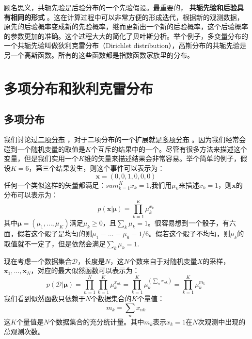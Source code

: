 \documentclass[10pt,a4paper,UTF8]{article}
\begin{document}
顾名思义，共轭先验是后验分布的一个先验假设。最重要的， \textbf{共轭先验和后验具有相同的形式} 。这在计算过程中可以非常方便的形成迭代，根据新的观测数据，原先的后验概率变成新的先验概率，继而更新出一个新的后验概率，这个后验概率的参数更加的准确。这个过程大大的简化了贝叶斯分析。举个例子，多变量分布的一个共轭先验叫做狄利克雷分布（Dirichlet distribution），高斯分布的共轭先验是另一个高斯函数。所有的这些函数都是指数函数家族里的分布。
\section{多项分布和狄利克雷分布}
\label{sec:org7eb1fab}


\subsection{多项分布}
\label{sec:orgb360b48}

我们讨论过\href{file:///c:/Users/cliyh/AppData/Roaming/zorg/output/math/probability/binary-distribution.thm}{二项分布} ，对于二项分布的一个扩展就是\href{file:///c:/Users/cliyh/AppData/Roaming/zorg/output/math/probability/afcp-01dot5-multinomial-coefficients.org}{多项分布} 。因为我们经常会碰到一个随机变量的取值是\(K\)个互斥的结果中的一个。尽管有很多方法来描述这个变量，但是我们实用一个\(K\)维的矢量来描述结果会非常容易。举个简单的例子，假设\(K=6\)，第三个结果发生，则这个事件可以表示为：
\begin{equation}
\label{eq:1}
\mathbf{x} = (0,0,1,0,0,0)
\end{equation}
任何一个类似这样的矢量都满足：\(sum_{k=1}^{K}x_{k} = 1\),我们用\(\mu_{k}\)来描述\(x_{k}=1\)，则\(\mathbf{x}\)的分布可以表示为：
\begin{equation}
\label{eq:2}
p(\mathbf{x}| \mathrm{\mu}) = \prod_{k=1}^{K}\mu_{k}^{x_{k}}
\end{equation}
其中\(\mathbf{\mu} = (\mu_{1},\ldots ,\mu_{K})\)满足\(\mu_{k} \geq 0\)，且\(\sum_{k} \mu_{k} = 1\)。很容易想到一个骰子，有六面，假若这个骰子是均匀的则\(\mu_{1} = \ldots = \mu_{6} = 1/6\)。假若这个骰子不均匀，则\(\mu_{k}\)的取值就不一定了，但是依然会满足\(\sum_{k}\mu_{k} = 1\).

现在考虑一个数据集合\(\mathcal{D}\)，长度是\(N\)，这\(N\)个数来自于对随机变量\(X\)的采样，\(\mathbf{x}_{1},\ldots , \mathbf{x}_{N}\)，对应的最大似然函数可以表示为：
\begin{equation}
\label{eq:3}
p(\mathcal{D}| \mathbf{\mu}) = \prod_{n=1}^{N}\prod_{k=1}^{K}\mu_{k}^{x_{nk}} = \prod_{k=1}^{K}\mu_{k}^{(\sum_{n}x_{nk})} = \prod_{k=1}^{K}\mu_{k}^{m_{k}}
\end{equation}
我们看到似然函数只依赖于\(N\)个数据集合的\(K\)个量值：
\begin{equation}
\label{eq:4}
m_{k} = \sum_{n}x_{nk}
\end{equation}
这\(K\)个量值是\(N\)个数据集合的充分统计量。其中\(m_{k}\)表示\(x_{k} = 1\)在\(N\)次观测中出现的总观测次数。
\end{document}

